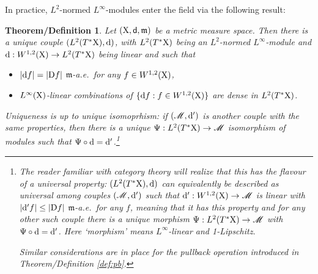 \documentclass[11pt]{article}
\numberwithin{equation}{section}
\newtheorem{thmdef}[theorem]{Theorem/Definition}
\newcommand{\X}{{\rm X}}
\newcommand{\sfd}{{\sf d}}
\newcommand{\mm}{{\mathfrak m}}
\renewcommand{\d}{{\rm d}}
\newcommand{\D}{{\rm D}}
\newcommand{\M}{\mathscr M}
\begin{document}
In practice, $L^2$-normed $L^\infty$-modules enter the field via the following result:
\begin{thmdef}\label{thmdef:d}
Let $(\X,\sfd,\mm)$ be a metric measure space. Then there is a unique couple $(L^2(T^*\X),\d)$, with $L^2(T^*\X)$ being an $L^2$-normed $L^\infty$-module and $\d:W^{1,2}(\X)\to L^2(T^*\X)$ being linear and such that
\begin{itemize}
\item[i)] $|\d f|=|\D f|$ $\mm$-a.e.\ for any $f\in W^{1,2}(\X)$,
\item[ii)] $L^\infty(\X)$-linear combinations of  $\{\d f:f\in W^{1,2}(\X)\}$ are dense in $L^2(T^*\X)$.
\end{itemize}
Uniqueness is  up to unique isomoprhism: if $(\M,\d')$ is another couple with the same properties, then there is a unique $\Psi:L^2(T^*\X)\to \M$ isomorphism of modules such that $\Psi\circ\d=\d'$.\footnote{The reader familiar with category theory will realize that this has the flavour of a universal property: $(L^2(T^*\X),\d)$ can equivalently be described as universal among  couples $(\M,\d')$  such that $\d':W^{1,2}(\X)\to \M$ is linear with $|\d' f|\leq |\D f|$ $\mm$-a.e.\ for any $f$, meaning that it has this property and for any other such couple there is a unique morphism $\Psi:L^2(T^*\X)\to \M$  with $\Psi\circ\d=\d'$. Here `morphism' means $L^\infty$-linear and 1-Lipschitz. 

Similar considerations are in place for the pullback operation introduced in Theorem/Definition \ref{def:pb}.}
\end{thmdef}
\end{document}
